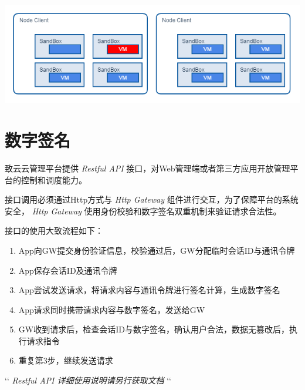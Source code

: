 \documentclass[letterpaper,10pt]{sphinxmanual}
\begin{document}
\includegraphics{5_1_sandbox.png}


\section{数字签名}
\label{index:id24}
致云云管理平台提供 \emph{Restful API} 接口，对Web管理端或者第三方应用开放管理平台的控制和调度能力。

接口调用必须通过Http方式与 \emph{Http Gateway} 组件进行交互，为了保障平台的系统安全， \emph{Http Gateway} 使用身份校验和数字签名双重机制来验证请求合法性。

接口的使用大致流程如下：
\begin{enumerate}
\item {} 
App向GW提交身份验证信息，校验通过后，GW分配临时会话ID与通讯令牌

\item {} 
App保存会话ID及通讯令牌

\item {} 
App尝试发送请求，将请求内容与通讯令牌进行签名计算，生成数字签名

\item {} 
App请求同时携带请求内容与数字签名，发送给GW

\item {} 
GW收到请求后，检查会话ID与数字签名，确认用户合法，数据无篡改后，执行请求指令

\item {} 
重复第3步，继续发送请求

\end{enumerate}

{}`{}` \emph{Restful API 详细使用说明请另行获取文档} {}`{}`
\end{document}
